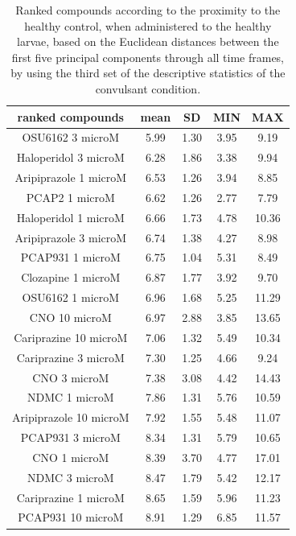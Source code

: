 \documentclass[a4paper,12pt]{article}
\begin{document}
\newpage
\begin{table}[h!]\tiny
\centering
\caption{Ranked compounds according to the proximity to the healthy control, when administered to the healthy larvae, based on the Euclidean distances between the first five principal components through all time frames, by using the third set of the descriptive statistics of the convulsant condition.}
\begin{tabular}{|c|c|c|c|c|}
\hline
ranked compounds             & mean & SD   & MIN  & MAX   \\ \hline
OSU6162 3 microM       & 5.99  & 1.30  & 3.95 & 9.19  \\ \hline
Haloperidol 3 microM   & 6.28  & 1.86 & 3.38 & 9.94  \\ \hline
Aripiprazole 1 microM  & 6.53  & 1.26 & 3.94 & 8.85  \\ \hline
PCAP2 1 microM         & 6.62  & 1.26 & 2.77 & 7.79  \\ \hline
Haloperidol 1 microM   & 6.66  & 1.73 & 4.78 & 10.36 \\ \hline
Aripiprazole 3 microM  & 6.74  & 1.38 & 4.27 & 8.98  \\ \hline
PCAP931 1 microM       & 6.75  & 1.04 & 5.31 & 8.49  \\ \hline
Clozapine 1 microM     & 6.87  & 1.77 & 3.92 & 9.70   \\ \hline
OSU6162 1 microM       & 6.96  & 1.68 & 5.25 & 11.29 \\ \hline
CNO 10 microM          & 6.97  & 2.88 & 3.85 & 13.65 \\ \hline
Cariprazine 10 microM  & 7.06  & 1.32 & 5.49 & 10.34 \\ \hline
Cariprazine 3 microM   & 7.30   & 1.25 & 4.66 & 9.24  \\ \hline
CNO 3 microM           & 7.38  & 3.08 & 4.42 & 14.43 \\ \hline
NDMC 1 microM          & 7.86  & 1.31 & 5.76 & 10.59 \\ \hline
Aripiprazole 10 microM & 7.92  & 1.55 & 5.48 & 11.07 \\ \hline
PCAP931 3 microM       & 8.34  & 1.31 & 5.79 & 10.65 \\ \hline
CNO 1 microM           & 8.39  & 3.70  & 4.77 & 17.01 \\ \hline
NDMC 3 microM          & 8.47  & 1.79 & 5.42 & 12.17 \\ \hline
Cariprazine 1 microM   & 8.65  & 1.59 & 5.96 & 11.23 \\ \hline
PCAP931 10 microM      & 8.91  & 1.29 & 6.85 & 11.57 \\ \hline

\end{tabular}
\end{table}
\end{document}
